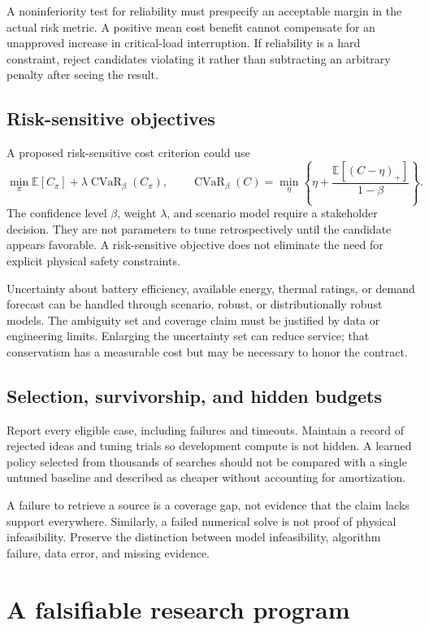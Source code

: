 \documentclass[11pt,letterpaper]{article}
\newcommand{\E}{\mathbb E}\newcommand{\R}{\mathbb R}\newcommand{\CRGC}{\operatorname{CRGC}}
\begin{document}
A noninferiority test for reliability must prespecify an acceptable margin in the actual risk metric. A positive mean cost benefit cannot compensate for an unapproved increase in critical-load interruption. If reliability is a hard constraint, reject candidates violating it rather than subtracting an arbitrary penalty after seeing the result.

\subsection{Risk-sensitive objectives}
A proposed risk-sensitive cost criterion could use
\[
 \min_\pi \E[C_\pi]+\lambda\operatorname{CVaR}_\beta(C_\pi),
 \qquad
 \operatorname{CVaR}_\beta(C)=
 \min_\eta\left\{\eta+\frac{\E[(C-\eta)_+]}{1-\beta}\right\}.
\]
The confidence level $\beta$, weight $\lambda$, and scenario model require a stakeholder decision. They are not parameters to tune retrospectively until the candidate appears favorable. A risk-sensitive objective does not eliminate the need for explicit physical safety constraints.

Uncertainty about battery efficiency, available energy, thermal ratings, or demand forecast can be handled through scenario, robust, or distributionally robust models. The ambiguity set and coverage claim must be justified by data or engineering limits. Enlarging the uncertainty set can reduce service; that conservatism has a measurable cost but may be necessary to honor the contract.

\subsection{Selection, survivorship, and hidden budgets}
Report every eligible case, including failures and timeouts. Maintain a record of rejected ideas and tuning trials so development compute is not hidden. A learned policy selected from thousands of searches should not be compared with a single untuned baseline and described as cheaper without accounting for amortization.

A failure to retrieve a source is a coverage gap, not evidence that the claim lacks support everywhere. Similarly, a failed numerical solve is not proof of physical infeasibility. Preserve the distinction between model infeasibility, algorithm failure, data error, and missing evidence.

\section{A falsifiable research program}
\label{sec:program}
\end{document}
